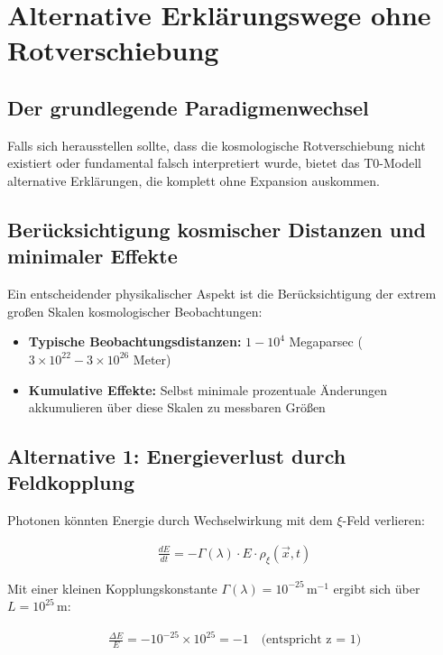 \documentclass{article}
\begin{document}
\section{Alternative Erklärungswege ohne Rotverschiebung}

\subsection{Der grundlegende Paradigmenwechsel}

Falls sich herausstellen sollte, dass die kosmologische Rotverschiebung nicht existiert oder fundamental falsch interpretiert wurde, bietet das T0-Modell alternative Erklärungen, die komplett ohne Expansion auskommen.

\subsection{Berücksichtigung kosmischer Distanzen und minimaler Effekte}

Ein entscheidender physikalischer Aspekt ist die Berücksichtigung der extrem großen Skalen kosmologischer Beobachtungen:

\begin{itemize}
	\item \textbf{Typische Beobachtungsdistanzen:} $1 - 10^4$ Megaparsec ($3 \times 10^{22} - 3 \times 10^{26}$ Meter)
	\item \textbf{Kumulative Effekte:} Selbst minimale prozentuale Änderungen akkumulieren über diese Skalen zu messbaren Größen
\end{itemize}

\subsection{Alternative 1: Energieverlust durch Feldkopplung}

Photonen könnten Energie durch Wechselwirkung mit dem $\xi$-Feld verlieren:

\begin{align}
	\frac{dE}{dt} = -\Gamma(\lambda) \cdot E \cdot \rho_\xi(\vec{x},t)
\end{align}

Mit einer kleinen Kopplungskonstante $\Gamma(\lambda) = 10^{-25} \, \text{m}^{-1}$ ergibt sich über $L = 10^{25} \, \text{m}$:

\begin{align}
	\frac{\Delta E}{E} = -10^{-25} \times 10^{25} = -1 \quad \text{(entspricht z = 1)}
\end{align}
\end{document}

